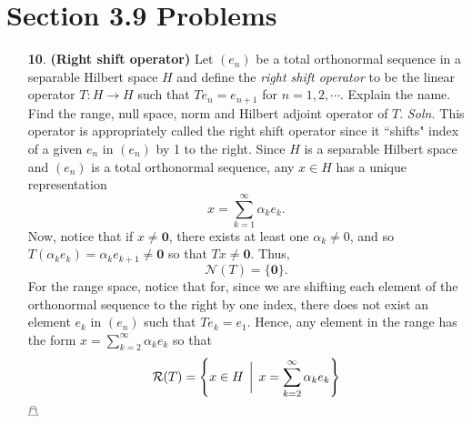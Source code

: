 \documentclass{article}
\begin{document}
\section*{Section 3.9 Problems}
\begin{itemize}
    \item[\textbf{10}.] \textbf{(Right shift operator)} Let $(e_n)$ be a total orthonormal sequence in a separable Hilbert space $H$ and define the \textit{right shift operator} to be the linear operator $T: H \to H$ such that $Te_n = e_{n+1}$ for $n = 1,2,\cdots$. Explain the name. Find the range, null space, norm and Hilbert adjoint operator of $T$.
    \newline\newline
    \textit{Soln.} This operator is appropriately called the right shift operator since it ``shifts" index of a given $e_n$ in $(e_n)$ by 1 to the right. \newline
    Since $H$ is a separable Hilbert space and $(e_n)$ is a total orthonormal sequence, any $x \in H$ has a unique representation
    \[x = \sum_{k = 1}^{\infty} \alpha_k e_k.\]
    Now, notice that if $x \neq \mathbf{0}$, there exists at least one $\alpha_k \neq 0$, and so $T(\alpha_k e_k) = \alpha_k e_{k+1} \neq \mathbf{0}$ so that $Tx \neq \mathbf{0}$. Thus, 
    \[\mathcal{N}(T) = \{\mathbf{0}\}.\]
    For the range space, notice that for, since we are shifting each element of the orthonormal sequence to the right by one index, there does not exist an element $e_k$ in $(e_n)$ such that $Te_k = e_1$. Hence, any element in the range has the form $x = \sum_{k=2}^{\infty} \alpha_k e_k$ so that
    \[\mathcal{R}(T) = \left\{x \in H \hspace{0.15cm} \bigg| \hspace{0.15cm} x = \sum_{k = 2}^{\infty} \alpha_k e_k\right\}\]
    \hfill $\mathghost$
\end{itemize}
\end{document}
